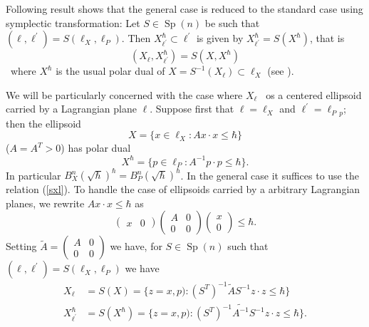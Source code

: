 \documentclass[11pt]{article}%
\begin{document}
Following result shows that the general case is reduced to the standard case
using symplectic transformation: Let $S\in\operatorname*{Sp}(n)$ be such that
$(\ell,\ell^{\prime})=S(\ell_{X},\ell_{P})$. Then $X_{\ell^{\prime}}^{\hbar
}\subset\ell^{\prime}$ is given by $X_{\ell^{\prime}}^{\hbar}=S(X^{\hbar})$,
that is
\begin{equation}
(X_{\ell},X_{\ell^{\prime}}^{\hbar})=S(X,X^{\hbar}) \label{sxl}%
\end{equation}
\ where $X^{\hbar}$ is the usual polar dual of $X=S^{-1}(X_{\ell})\subset
\ell_{X}$ (see \cite{BSM}).

We will be particularly concerned with the case where $X_{\ell}$ \ os a
centered ellipsoid carried by a Lagrangian plane $\ell$. Suppose first that
$\ell=\ell_{X}$ and $\ell^{\prime}=\ell_{P}{}_{p}$; then the ellipsoid%
\begin{equation}
X=\{x\in\ell_{X}:Ax\cdot x\leq\hbar\} \label{exc1}%
\end{equation}
($A=A^{T}>0$) has polar dual
\begin{equation}
X^{\hbar}=\{p\in\ell_{P}:A^{-1}p\cdot p\leq\hbar\}. \label{exc2}%
\end{equation}
In particular $B_{X}^{n}(\sqrt{\hbar})^{\hbar}=B_{P}^{n}(\sqrt{\hbar})^{\hbar
}$. In the general case it suffices to use the relation (\ref{sxl}). To handle
the case of ellipsoids carried by a arbitrary Lagrangian planes, we rewrite
$Ax\cdot x\leq\hbar$ as
\[%
\begin{pmatrix}
x & 0
\end{pmatrix}%
\begin{pmatrix}
A & 0\\
0 & 0
\end{pmatrix}%
\begin{pmatrix}
x\\
0
\end{pmatrix}
\leq\hbar.
\]
Setting $\widetilde{A}=%
\begin{pmatrix}
A & 0\\
0 & 0
\end{pmatrix}
$ we have, for $S\in\operatorname*{Sp}(n)$ such that $(\ell,\ell^{\prime
})=S(\ell_{X},\ell_{P})$ we have%
\begin{align}
X_{\ell}  &  =S(X)=\{z=x,p):(S^{T})^{-1}\widetilde{A}S^{-1}z\cdot z\leq
\hbar\}\label{sxh1}\\
X_{\ell^{\prime}}^{\hbar}  &  =S(X^{\hbar})=\{z=x,p):(S^{T})^{-1}%
\widetilde{A^{-1}}S^{-1}z\cdot z\leq\hbar\}. \label{sxh2}%
\end{align}
\end{document}
